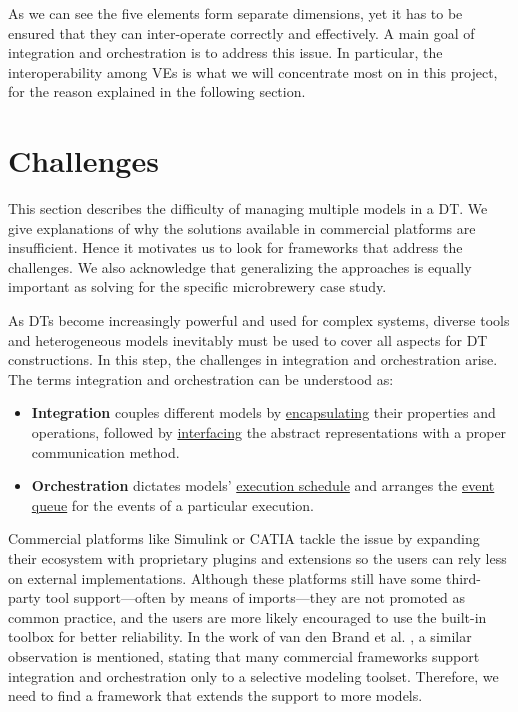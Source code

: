As we can see the five elements form separate dimensions, yet it has to be ensured that they can inter-operate correctly and effectively. A main goal of integration and orchestration is to address this issue. In particular, the interoperability among VEs is what we will concentrate most on in this project, for the reason explained in the following section. 


\section{Challenges}\label{sec:challenges}
This section describes the difficulty of managing multiple models in a DT. We give explanations of why the solutions available in commercial platforms are insufficient. Hence it motivates us to look for frameworks that address the challenges. We also acknowledge that generalizing the approaches is equally important as solving for the specific microbrewery case study.

As DTs become increasingly powerful and used for complex systems, diverse tools and heterogeneous models inevitably must be used to cover all aspects for DT constructions. In this step, the challenges in integration and orchestration arise. The terms integration and orchestration can be understood as:

\begin{itemize}

  \item \textbf{Integration} couples different models by \underline{encapsulating} their properties and operations, followed by \underline{interfacing} the abstract representations with a proper communication method.

  \item \textbf{Orchestration} dictates models' \underline{execution schedule} and arranges the \underline{event queue} for the events of a particular execution.

\end{itemize}

Commercial platforms like Simulink \cite{Simulink} or CATIA \cite{CATIA} tackle the issue by expanding their ecosystem with proprietary plugins and extensions so the users can rely less on external implementations. Although these platforms still have some third-party tool support---often by means of imports---they are not promoted as common practice, and the users are more likely encouraged to use the built-in toolbox for better reliability. In the work of van den Brand et al. \cite{brand2021}, a similar observation is mentioned, stating that many commercial frameworks support integration and orchestration only to a selective modeling toolset. Therefore, we need to find a framework that extends the support to more models.

